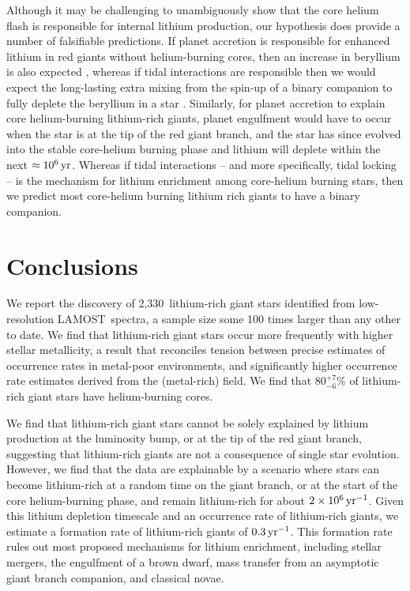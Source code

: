 \documentclass[twocolumn]{aastex62}
\newcommand{\SampleSize}{2,330}
\newcommand\lamost{LAMOST}
\begin{document}
Although it may be challenging to unambiguously show that the core helium flash is
responsible for internal lithium production, our hypothesis does provide a number of
falsifiable predictions. 
If planet accretion is responsible for enhanced lithium in red giants without 
helium-burning cores, then an increase in beryllium is also expected \citep{Siess_1999,
Melo_2005}, whereas if tidal interactions are responsible then we would expect the 
long-lasting extra mixing from the spin-up of a binary companion to fully deplete
the beryllium in a star \citep{Sackmann_1999}.
Similarly, for planet accretion to explain core helium-burning lithium-rich giants,
planet engulfment would have to occur when the star is at the tip of the red giant
branch, and the star has since evolved into the stable core-helium burning phase and
lithium will deplete within the next $\approx10^{6}\,{\rm yr}$. Whereas if tidal interactions -- and more specifically, tidal locking -- is the mechanism for lithium enrichment among core-helium burning stars, then we predict most core-helium burning lithium rich giants to have a binary companion.


\section{Conclusions} \label{sec:conclusions}

We report the discovery of \SampleSize\ lithium-rich giant stars identified
from low-resolution \lamost\ spectra, a sample size some 100 times larger than any other to date.
We find that lithium-rich giant stars occur more frequently with higher stellar 
metallicity, a result that reconciles tension between precise estimates of occurrence
rates in metal-poor environments, and significantly higher occurrence rate estimates
derived from the (metal-rich) field. We find that $80^{+7}_{-6}$\% of lithium-rich 
giant stars have helium-burning cores.

We find that lithium-rich giant stars cannot be solely explained by lithium production
at the luminosity bump, or at the tip of the red giant branch, suggesting that 
lithium-rich giants are not a consequence of single star evolution. However, we find
that the data are explainable by a scenario where stars can become lithium-rich 
at a random time on the giant branch, or at the start of the core helium-burning
phase, and remain lithium-rich for about $2\times10^{6}\,{\rm yr}^{-1}$. 
Given this lithium depletion timescale and an occurrence rate of lithium-rich giants, 
we estimate a formation rate of lithium-rich giants of $0.3\,{\rm yr}^{-1}$. This
formation rate rules out most proposed mechanisms for lithium enrichment, including
stellar mergers, the engulfment of a brown dwarf, mass transfer from an asymptotic 
giant branch companion, and classical novae.
\end{document}
